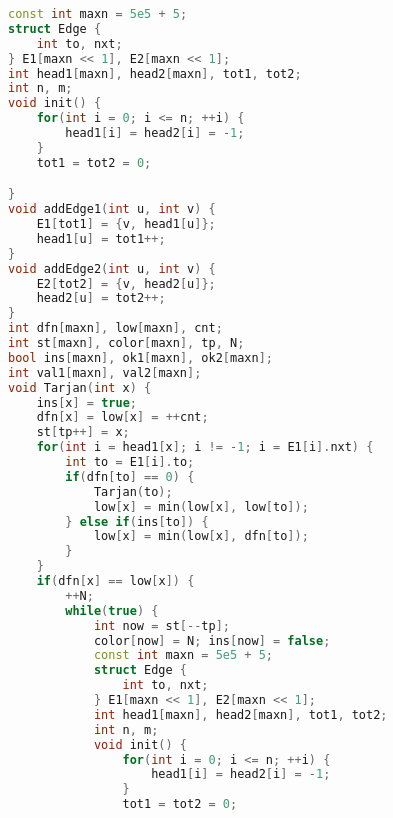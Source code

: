 \begin{lstlisting}[language=C++]
const int maxn = 5e5 + 5;
struct Edge {
    int to, nxt;
} E1[maxn << 1], E2[maxn << 1];
int head1[maxn], head2[maxn], tot1, tot2;
int n, m;
void init() {
    for(int i = 0; i <= n; ++i) {
        head1[i] = head2[i] = -1;
    }
    tot1 = tot2 = 0;

}
void addEdge1(int u, int v) {
    E1[tot1] = {v, head1[u]};
    head1[u] = tot1++;
}
void addEdge2(int u, int v) {
    E2[tot2] = {v, head2[u]};
    head2[u] = tot2++;
}
int dfn[maxn], low[maxn], cnt;
int st[maxn], color[maxn], tp, N;
bool ins[maxn], ok1[maxn], ok2[maxn];
int val1[maxn], val2[maxn];
void Tarjan(int x) {
    ins[x] = true;
    dfn[x] = low[x] = ++cnt;
    st[tp++] = x;
    for(int i = head1[x]; i != -1; i = E1[i].nxt) {
        int to = E1[i].to;
        if(dfn[to] == 0) {
            Tarjan(to);
            low[x] = min(low[x], low[to]);
        } else if(ins[to]) {
            low[x] = min(low[x], dfn[to]);
        }
    }
    if(dfn[x] == low[x]) {
        ++N;
        while(true) {
            int now = st[--tp];
            color[now] = N; ins[now] = false;
            const int maxn = 5e5 + 5;
            struct Edge {
                int to, nxt;
            } E1[maxn << 1], E2[maxn << 1];
            int head1[maxn], head2[maxn], tot1, tot2;
            int n, m;
            void init() {
                for(int i = 0; i <= n; ++i) {
                    head1[i] = head2[i] = -1;
                }
                tot1 = tot2 = 0;
            

\end{lstlisting}
